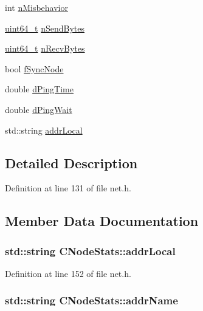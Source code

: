 \begin{DoxyCompactItemize}
\item 
int \hyperlink{class_c_node_stats_ae5c21d0bb707eff8e43174078c1a1a00}{n\+Misbehavior}
\item 
\hyperlink{stdint_8h_aaa5d1cd013383c889537491c3cfd9aad}{uint64\+\_\+t} \hyperlink{class_c_node_stats_a3c70b0862e9ddd682380114016196137}{n\+Send\+Bytes}
\item 
\hyperlink{stdint_8h_aaa5d1cd013383c889537491c3cfd9aad}{uint64\+\_\+t} \hyperlink{class_c_node_stats_a1aaec0f47a95487cbd709caf15889663}{n\+Recv\+Bytes}
\item 
bool \hyperlink{class_c_node_stats_a82d6fca82ac649d6ba746a18faec6d79}{f\+Sync\+Node}
\item 
double \hyperlink{class_c_node_stats_a535c198cbe3af112d4538f535e6618cd}{d\+Ping\+Time}
\item 
double \hyperlink{class_c_node_stats_a03a38f87940d04b321b9fb3102d0368d}{d\+Ping\+Wait}
\item 
std\+::string \hyperlink{class_c_node_stats_a027a5445a0c40e6489875e653be9c758}{addr\+Local}
\end{DoxyCompactItemize}


\subsection{Detailed Description}


Definition at line 131 of file net.\+h.



\subsection{Member Data Documentation}
\hypertarget{class_c_node_stats_a027a5445a0c40e6489875e653be9c758}{}
\subsubsection[{addr\+Local}]{\setlength{\rightskip}{0pt plus 5cm}std\+::string C\+Node\+Stats\+::addr\+Local}\label{class_c_node_stats_a027a5445a0c40e6489875e653be9c758}


Definition at line 152 of file net.\+h.

\hypertarget{class_c_node_stats_a3299ecdae870c367fe657f3f59b27e43}{}
\subsubsection[{addr\+Name}]{\setlength{\rightskip}{0pt plus 5cm}std\+::string C\+Node\+Stats\+::addr\+Name}\label{class_c_node_stats_a3299ecdae870c367fe657f3f59b27e43}


